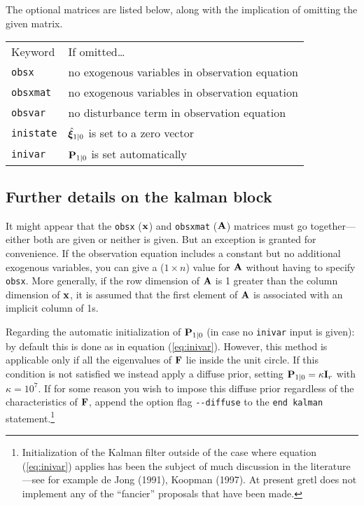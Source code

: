 \documentclass[a4paper]{article}
\newcommand{\obsx}{\ensuremath\mathbf{x}}
\newcommand{\obsxmat}{\ensuremath\mathbf{A}}
\newcommand{\statevec}{\ensuremath\mathbf{\bm \xi}}
\newcommand{\statemat}{\ensuremath\mathbf{F}}
\newcommand{\statevar}{\ensuremath\mathbf{P}}
\begin{document}
The optional matrices are listed below, along with the implication
of omitting the given matrix.

\begin{center}
\begin{tabular}{ll}
Keyword & If omitted\dots \\ [6pt]
\texttt{obsx} & no exogenous variables in observation equation\\
\texttt{obsxmat} & no exogenous variables in observation equation\\
\texttt{obsvar} & no disturbance term in observation equation\\
\texttt{inistate} & $\hat{\statevec}_{1|0}$ is set to a zero vector\\
\texttt{inivar} & $\statevar_{1|0}$ is set automatically\\
\end{tabular}
\end{center}

\subsection{Further details on the kalman block}

It might appear that the \texttt{obsx} ($\obsx$) and \texttt{obsxmat}
($\obsxmat$) matrices must go together---either both are given or
neither is given.  But an exception is granted for convenience.  If
the observation equation includes a constant but no additional
exogenous variables, you can give a ($1 \times n$) value for
$\obsxmat$ without having to specify \texttt{obsx}.  More generally,
if the row dimension of $\obsxmat$ is 1 greater than the column
dimension of $\obsx$, it is assumed that the first element of
$\obsxmat$ is associated with an implicit column of 1s.

Regarding the automatic initialization of $\statevar_{1|0}$ (in case
no \texttt{inivar} input is given): by default this is done as in
equation (\ref{eq:inivar}).  However, this method is applicable only
if all the eigenvalues of $\statemat$ lie inside the unit circle.  If
this condition is not satisfied we instead apply a diffuse prior,
setting $\statevar_{1|0} = \kappa \mathbf{I}_r$ with $\kappa = 10^7$.
If for some reason you wish to impose this diffuse prior regardless of
the characteristics of $\statemat$, append the option flag
\verb|--diffuse| to the \texttt{end kalman} statement.\footnote{
  Initialization of the Kalman filter outside of the case where
  equation (\ref{eq:inivar}) applies has been the subject of much
  discussion in the literature---see for example de Jong (1991),
  Koopman (1997).  At present gretl does not implement any of the
  ``fancier'' proposals that have been made.}
\end{document}
